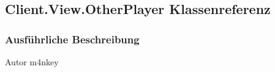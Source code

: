 \hypertarget{a00070}{\subsection{Client.\-View.\-Other\-Player Klassenreferenz}
\label{a00070}
}


\subsubsection{Ausführliche Beschreibung}
\begin{DoxyAuthor}{Autor}
m4nkey 
\end{DoxyAuthor}
